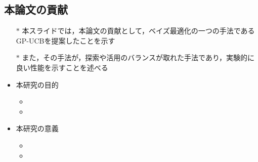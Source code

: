 \documentclass[dvipdfmx, 10.5pt]{beamer}
\begin{document}

\subsection{本論文の貢献}

\begin{frame}{\insertsubsection}
	\begin{itemize}
		\item[$\ast$] 本スライドでは，本論文の貢献として，ベイズ最適化の一つの手法であるGP-UCBを提案したことを示す
		\item[$\ast$] また，その手法が，探索や活用のバランスが取れた手法であり，実験的に良い性能を示すことを述べる
		\item 本研究の目的
		\begin{itemize}
			\item 
			\item 
		\end{itemize}
		\item 本研究の意義
		\begin{itemize}
			\item 
			\item 
		\end{itemize}
	\end{itemize}


\end{frame}

\end{document}
